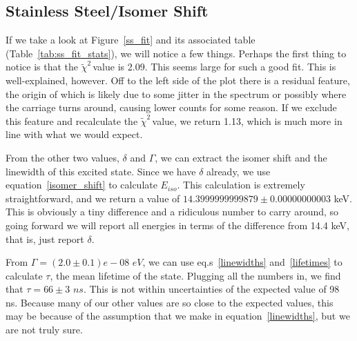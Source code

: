 \documentclass[reprint, nobibnotes, amssymb, amsmath, amsfonts, mathtools, mathrsfs, floatfix]{revtex4-1}
\newcommand{\redchi}{$\tilde{\chi}^2\,$}
\begin{document}
    \subsection{Stainless Steel/Isomer Shift}
      If we take a look at Figure~\ref{ss_fit} and its associated table (Table~\ref{tab:ss_fit_stats}), we will notice a few things.  Perhaps the first thing to notice is that the \redchi value is 2.09.  This seems large for such a good fit.  This is well-explained, however.  Off to the left side of the plot there is a residual feature, the origin of which is likely due to some jitter in the spectrum or possibly where the carriage turns around, causing lower counts for some reason.  If we exclude this feature and recalculate the \redchi value, we return 1.13, which is much more in line with what we would expect.

      From the other two values, $\delta$ and $\Gamma$, we can extract the isomer shift and the linewidth of this excited state.  Since we have $\delta$ already, we use equation~\ref{isomer_shift} to calculate $E_{iso}$.  This calculation is extremely straightforward, and we return a value of $14.3999999999879 \pm 0.00000000003$ keV.  This is obviously a tiny difference and a ridiculous number to carry around, so going forward we will report all energies in terms of the difference from 14.4 keV, that is, just report $\delta$.

      From $\Gamma = (2.0 \pm 0.1)e-08 \,\, eV$, we can use eq.s~\ref{linewidths} and~\ref{lifetimes} to calculate $\tau$, the mean lifetime of the state.  Plugging all the numbers in, we find that $\tau = 66\pm3\,\, ns$.  This is not within uncertainties of the expected value of 98 ns.  Because many of our other values are so close to the expected values, this may be because of the assumption that we make in equation~\ref{linewidths}, but we are not truly sure.
\end{document}
